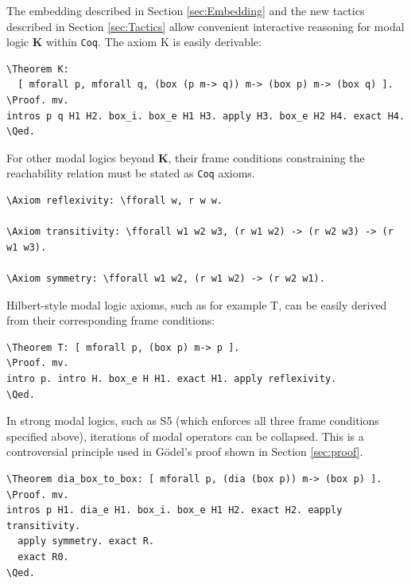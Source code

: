 \documentclass{llncs}
\newcommand{\red}[1]{\textcolor[rgb]{1,0,0}{#1}}
\newcommand{\blue}[1]{\textcolor[rgb]{0,0,1}{#1}}
\newcommand{\Axiom}{\red{Axiom}}
\newcommand{\Theorem}{\red{Theorem}}
\newcommand{\fforall}{\blue{forall}}
\newcommand{\Proof}{\blue{Proof}}
\newcommand{\Qed}{\blue{Qed}}
\newcommand{\Coq}{\texttt{Coq}\xspace}
\begin{document}
The embedding described in Section \ref{sec:Embedding} and the 
new tactics described in Section \ref{sec:Tactics} allow convenient 
interactive reasoning for modal logic \textbf{K} within \Coq. 
The axiom K is easily derivable:

\begin{Verbatim}[commandchars=\\\{\},fontsize=\verbsize]
\Theorem K: 
  [ mforall p, mforall q, (box (p m-> q)) m-> (box p) m-> (box q) ].
\Proof. mv. 
intros p q H1 H2. box_i. box_e H1 H3. apply H3. box_e H2 H4. exact H4. 
\Qed.
\end{Verbatim}

\noindent
For other modal logics beyond \textbf{K}, their frame conditions constraining 
the reachability relation must be stated as \Coq axioms.

\begin{Verbatim}[commandchars=\\\{\},fontsize=\verbsize]
\Axiom reflexivity: \fforall w, r w w.

\Axiom transitivity: \fforall w1 w2 w3, (r w1 w2) -> (r w2 w3) -> (r w1 w3).

\Axiom symmetry: \fforall w1 w2, (r w1 w2) -> (r w2 w1).
\end{Verbatim}

\noindent
Hilbert-style modal logic axioms, such as for example T, 
can be easily derived from their corresponding frame conditions:

\begin{Verbatim}[commandchars=\\\{\},fontsize=\verbsize]
\Theorem T: [ mforall p, (box p) m-> p ].
\Proof. mv. 
intro p. intro H. box_e H H1. exact H1. apply reflexivity. 
\Qed.
\end{Verbatim}

\noindent
In strong modal logics, such as S5 (which enforces all three frame conditions specified above), iterations of modal operators can be collapsed. This is a controversial principle used in G\"odel's proof shown in Section \ref{sec:proof}.

\begin{Verbatim}[commandchars=\\\{\},fontsize=\verbsize]
\Theorem dia_box_to_box: [ mforall p, (dia (box p)) m-> (box p) ].
\Proof. mv. 
intros p H1. dia_e H1. box_i. box_e H1 H2. exact H2. eapply transitivity. 
  apply symmetry. exact R. 
  exact R0.
\Qed.
\end{Verbatim}
\end{document}
